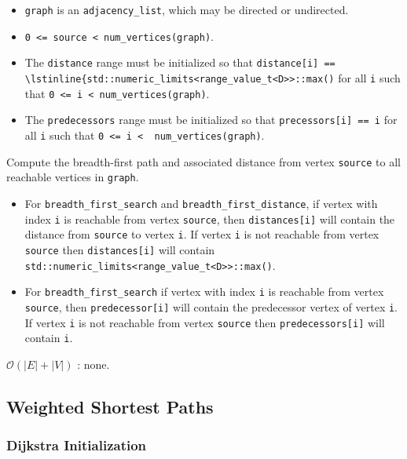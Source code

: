 \begin{itemdescr}
\pnum\preconditions
\begin{itemize}
\item
\lstinline{graph} is an \lstinline{adjacency_list}, which may be directed or
undirected.
\item
\lstinline{0 <= source < num_vertices(graph)}.

\item
  The \lstinline{distance} range must be initialized so that 
    \lstinline{distance[i] == \lstinline{std::numeric_limits<range_value_t<D>>::max()} 
    for all \lstinline{i}
    such that \lstinline{0 <= i < num_vertices(graph)}.  
\item
  The \lstinline{predecessors} range must be initialized so that
  \lstinline{precessors[i] == i} for all \lstinline{i} such that 
  \lstinline{0 <= i <  num_vertices(graph)}.
\end{itemize}
\pnum\effects Compute the breadth-first path and associated distance from vertex
\lstinline{source} to all reachable vertices in \lstinline{graph}.
\pnum\returns
\begin{itemize}
\item For \lstinline{breadth_first_search} and \lstinline{breadth_first_distance},
  if vertex with index \lstinline{i} is reachable from vertex \lstinline{source}, then
  \lstinline{distances[i]} will contain the distance from \lstinline{source} to vertex
  \lstinline{i}.  If vertex \lstinline{i} is not reachable from vertex
  \lstinline{source} then \lstinline{distances[i]} will contain
  \lstinline{std::numeric_limits<range_value_t<D>>::max()}.
\item
For \lstinline{breadth_first_search} if vertex with index \lstinline{i} is reachable
from vertex \lstinline{source}, then \lstinline{predecessor[i]} will contain the
predecessor vertex of vertex \lstinline{i}.  If vertex \lstinline{i} is not reachable
from vertex \lstinline{source} then \lstinline{predecessors[i]} will contain
\lstinline{i}.
\end{itemize}
%
\pnum\complexity $\mathcal{O}(|E| + |V|)$
\pnum\throws: none. 
\end{itemdescr}


\subsection{Weighted Shortest Paths}

\subsubsection{Dijkstra Initialization}

